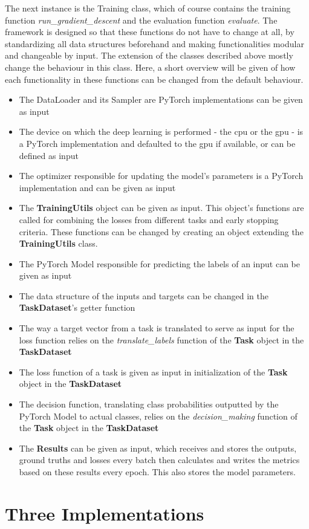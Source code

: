 The next instance is the Training class, which of course contains the training function \textit{run\_gradient\_descent} and the evaluation function \textit{evaluate}. The framework is designed so that these functions do not have to change at all, by standardizing all data structures beforehand and making functionalities modular and changeable by input. The extension of the classes described above mostly change the behaviour in this class. Here, a short overview will be given of how each functionality in these functions can be changed from the default behaviour. \\

\begin{itemize}
	\item The DataLoader and its Sampler are PyTorch implementations can be given as input
	\item The device on which the deep learning is performed - the cpu or the gpu - is a PyTorch implementation and defaulted to the gpu if available, or can be defined as input
	\item The optimizer responsible for updating the model's parameters is a PyTorch implementation and can be given as input
	\item The \textbf{TrainingUtils} object can be given as input. This object's functions are called for combining the losses from different tasks and early stopping criteria. These functions can be changed by creating an object extending the \textbf{TrainingUtils} class.
	\item The PyTorch Model responsible for predicting the labels of an input can be given as input
	\item The data structure of the inputs and targets can be changed in the \textbf{TaskDataset}'s getter function
	\item The way a target vector from a task is translated to serve as input for the loss function relies on the \textit{translate\_labels} function of the \textbf{Task} object in the \textbf{TaskDataset}
	\item The loss function of a task is given as input in initialization of the \textbf{Task} object in the \textbf{TaskDataset}
	\item The decision function, translating class probabilities outputted by the PyTorch Model to actual classes, relies on the \textit{decision\_making} function of the \textbf{Task} object in the \textbf{TaskDataset}
	\item The \textbf{Results} can be given as input, which receives and stores the outputs, ground truths and losses every batch then calculates and writes the metrics based on these results every epoch. This also stores the model parameters. 	
\end{itemize}

\section{Three Implementations}
